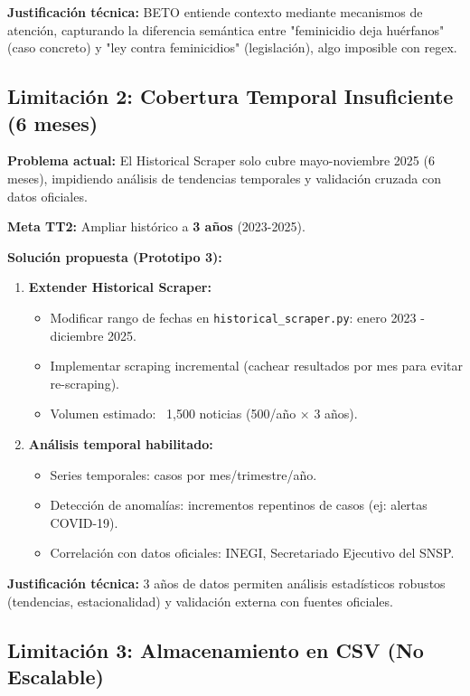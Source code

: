 \textbf{Justificación técnica:} BETO entiende contexto mediante mecanismos de atención, capturando la diferencia semántica entre "feminicidio deja huérfanos" (caso concreto) y "ley contra feminicidios" (legislación), algo imposible con regex.

\subsection{Limitación 2: Cobertura Temporal Insuficiente (6 meses)}
\label{subsec:lim2_temporal}

\textbf{Problema actual:} El Historical Scraper solo cubre mayo-noviembre 2025 (6 meses), impidiendo análisis de tendencias temporales y validación cruzada con datos oficiales.

\textbf{Meta TT2:} Ampliar histórico a \textbf{3 años} (2023-2025).

\textbf{Solución propuesta (Prototipo 3):}
\begin{enumerate}
    \item \textbf{Extender Historical Scraper:}
    \begin{itemize}
        \item Modificar rango de fechas en \texttt{historical\_scraper.py}: enero 2023 - diciembre 2025.
        \item Implementar scraping incremental (cachear resultados por mes para evitar re-scraping).
        \item Volumen estimado: ~1,500 noticias (500/año × 3 años).
    \end{itemize}
    
    \item \textbf{Análisis temporal habilitado:}
    \begin{itemize}
        \item Series temporales: casos por mes/trimestre/año.
        \item Detección de anomalías: incrementos repentinos de casos (ej: alertas COVID-19).
        \item Correlación con datos oficiales: INEGI, Secretariado Ejecutivo del SNSP.
    \end{itemize}
\end{enumerate}

\textbf{Justificación técnica:} 3 años de datos permiten análisis estadísticos robustos (tendencias, estacionalidad) y validación externa con fuentes oficiales.

\subsection{Limitación 3: Almacenamiento en CSV (No Escalable)}
\label{subsec:lim3_database}

